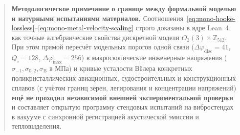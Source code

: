 \begin{quote}
\small\textbf{Методологическое примечание о границе между формальной моделью и натурными испытаниями материалов.}
Соотношения~\eqref{eq:mono-hooke-lossless}--\eqref{eq:mono-metal-velocity-scaling} строго доказаны в ядре Lean~4 как точные алгебраические свойства дискретной модели $O_2(3)\times\mathbb{Z}_{512}$. При этом прямой пересчёт модельных порогов одной связи ($\Delta\varphi_{\mathrm{disc}} = 41$, $Q_\square = 128$, $\Delta\varphi_{\max} = 256$) в макроскопические инженерные напряжения ($\sigma_{-1}, \sigma_{0{,}2}, \sigma_{\mathrm{B}}$ в МПа) и кривые усталости Вёлера конкретных поликристаллических авиационных, судостроительных и конструкционных сплавов (с учётом границ зёрен, легирования и концентрации напряжений) \textbf{ещё не проходил независимой внешней экспериментальной проверки} и составляет открытую программу стендовых испытаний на вибростендах в вакууме с синхронной регистрацией акустической эмиссии и тепловыделения.
\end{quote}


